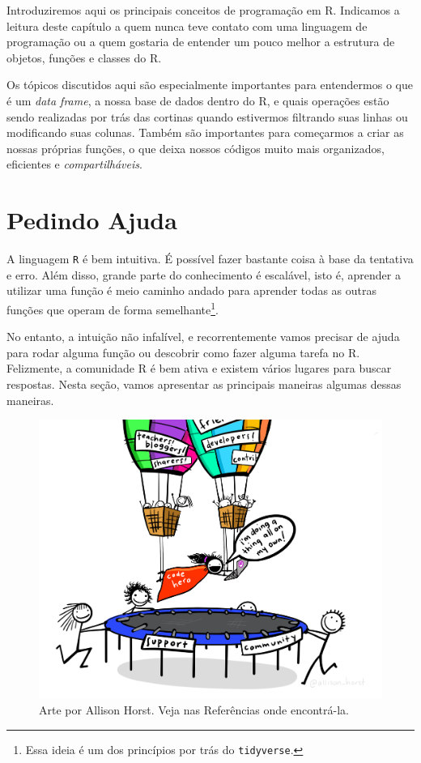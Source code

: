 \documentclass[]{book}
\begin{document}
Introduziremos aqui os principais conceitos de programação em R. Indicamos a leitura deste capítulo a quem nunca teve contato com uma linguagem de programação ou a quem gostaria de entender um pouco melhor a estrutura de objetos, funções e classes do R.

Os tópicos discutidos aqui são especialmente importantes para entendermos o que é um \emph{data frame}, a nossa base de dados dentro do R, e quais operações estão sendo realizadas por trás das cortinas quando estivermos filtrando suas linhas ou modificando suas colunas. Também são importantes para começarmos a criar as nossas próprias funções, o que deixa nossos códigos muito mais organizados, eficientes e \emph{compartilháveis}.

\hypertarget{pedindo-ajuda}{%
\section{Pedindo Ajuda}\label{pedindo-ajuda}}

A linguagem \texttt{R} é bem intuitiva. É possível fazer bastante coisa à base da tentativa e erro. Além disso, grande parte do conhecimento é escalável, isto é, aprender a utilizar uma função é meio caminho andado para aprender todas as outras funções que operam de forma semelhante\footnote{Essa ideia é um dos princípios por trás do \texttt{tidyverse}.}.

No entanto, a intuição não infalível, e recorrentemente vamos precisar de ajuda para rodar alguma função ou descobrir como fazer alguma tarefa no R. Felizmente, a comunidade R é bem ativa e existem vários lugares para buscar respostas. Nesta seção, vamos apresentar as principais maneiras algumas dessas maneiras.

\begin{figure}

{\centering \includegraphics[width=38.26in]{img/r-base/code_hero_rstats} 

}

\caption{Arte por Allison Horst. Veja nas Referências onde encontrá-la.}\label{fig:unnamed-chunk-14}
\end{figure}
\end{document}
